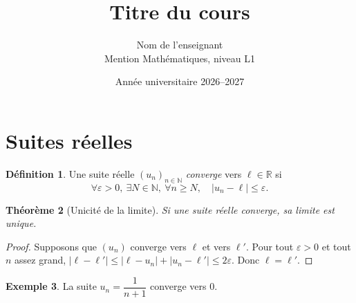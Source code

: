 \documentclass[11pt,a4paper]{article}
\title{Titre du cours}
\author{Nom de l'enseignant \\ \small Mention Mathématiques, niveau L1}
\date{Année universitaire 2026--2027}
\theoremstyle{plain}
\newtheorem{theoreme}{Théorème}[section]
\theoremstyle{definition}
\newtheorem{definition}[theoreme]{Définition}
\newtheorem{exemple}[theoreme]{Exemple}
\theoremstyle{remark}
\newcommand{\N}{\mathbb{N}}
\newcommand{\R}{\mathbb{R}}
\begin{document}
\maketitle
\tableofcontents

\section{Suites réelles}

\begin{definition}
Une suite réelle $(u_n)_{n \in \N}$ \emph{converge} vers $\ell \in \R$ si
\[
  \forall \varepsilon > 0,\ \exists N \in \N,\ \forall n \geq N,\quad |u_n - \ell| \leq \varepsilon .
\]
\end{definition}

\begin{theoreme}[Unicité de la limite]
Si une suite réelle converge, sa limite est unique.
\end{theoreme}

\begin{proof}
Supposons que $(u_n)$ converge vers $\ell$ et vers $\ell'$. Pour tout $\varepsilon > 0$ et
tout $n$ assez grand, $|\ell - \ell'| \leq |\ell - u_n| + |u_n - \ell'| \leq 2\varepsilon$.
Donc $\ell = \ell'$.
\end{proof}

\begin{exemple}
La suite $u_n = \dfrac{1}{n+1}$ converge vers $0$.
\end{exemple}
\end{document}
